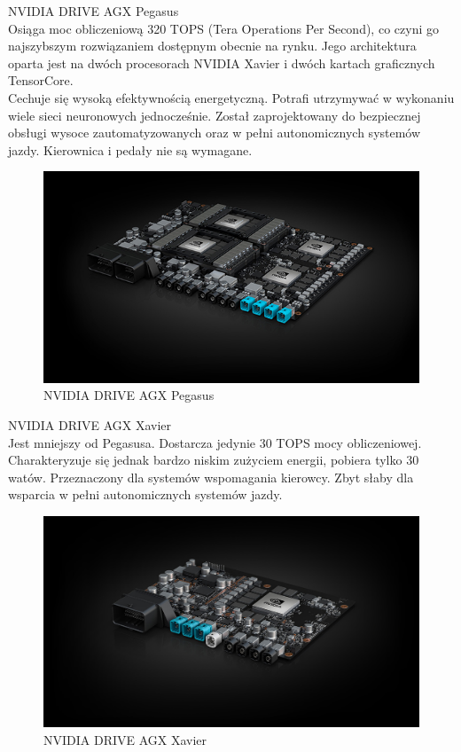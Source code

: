 \begin{enumerate*}
\item NVIDIA DRIVE AGX Pegasus \\
Osiąga moc obliczeniową 320 TOPS (Tera Operations Per Second), co czyni go najszybszym rozwiązaniem dostępnym obecnie na rynku. Jego architektura oparta jest na dwóch procesorach NVIDIA Xavier i dwóch kartach graficznych TensorCore. \\
Cechuje się wysoką efektywnością energetyczną. Potrafi utrzymywać w wykonaniu wiele sieci neuronowych jednocześnie. Został zaprojektowany do bezpiecznej obsługi wysoce zautomatyzowanych oraz w pełni autonomicznych systemów jazdy. Kierownica i pedały nie są wymagane.
\begin{figure}[h]
\begin{center}
\includegraphics[width=15cm]{resources/figures/nv-drive-pegasus.jpg}
\caption{NVIDIA DRIVE AGX Pegasus}
\label{NvidiaDrivePegasus}
\end{center}
\end{figure}

\item NVIDIA DRIVE AGX Xavier \\
Jest mniejszy od Pegasusa. Dostarcza jedynie 30 TOPS mocy obliczeniowej. Charakteryzuje się jednak bardzo niskim zużyciem energii, pobiera tylko 30 watów. Przeznaczony dla systemów wspomagania kierowcy. Zbyt słaby dla wsparcia w pełni autonomicznych systemów jazdy.
\begin{figure}[h]
\begin{center}
\includegraphics[width=15cm]{resources/figures/nv-drive-xavier.jpg}
\caption{NVIDIA DRIVE AGX Xavier}
\label{NvidiaDriveXavier}
\end{center}
\end{figure}


\end{enumerate*}
